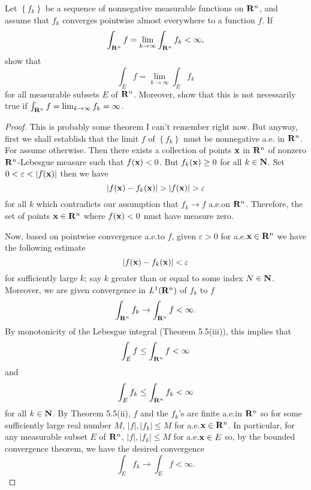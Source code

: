 \begin{problem}
Let $\left\{f_k\right\}$ be a sequence of nonnegative measurable functions
on $\mathbf{R}^n$, and assume that $f_k$ converges pointwise almost everywhere to
a function $f$. If
\[
\int_{\mathbf{R}^n} f=\lim_{k\to\infty}\int_{\mathbf{R}^n} f_k<\infty,
\]
show that
\[
\int_E f=\lim_{k\to\infty}\int_E f_k
\]
for all measurable subsets $E$ of $\mathbf{R}^n$. Moreover, show that this is not
necessarily true if $\int_{\mathbf{R}^n} f=\lim_{k\to\infty} f_k=\infty$.
\end{problem}
\begin{proof}
This is probably some theorem I can't remember right now. But anyway, first
we shall establish that the limit $f$ of $\left\{f_k\right\}$ must be
nonnegative a.e. in $\mathbf{R}^n$. For assume otherwise. Then there exists a
collection of points $\mathbf{x}$ in $\mathbf{R}^n$ of nonzero $\mathbf{R}^n$-Lebesgue
measure such that $f(\mathbf{x})<0$. But $f_k(\mathbf{x})\geq 0$ for all
$k\in\mathbf{N}$. Set $0<\varepsilon<|f(\bfx)|$ then we have
\begin{equation}
\label{eq:estimate-contradiction-1}
|f(\bfx)-f_k(\bfx)|>|f(\bfx)|>\varepsilon
\end{equation}
for all $k$ which contradicts our assumption that $f_k\to f$ a.e.\@ on
$\mathbf{R}^n$. Therefore, the set of points $\mathbf{x}\in\mathbf{R}^n$ where $f(\mathbf{x})<0$
must have measure zero.

Now, based on pointwise convergence a.e.\@ to $f$, given $\varepsilon>0$
for a.e.\@ $\mathbf{x}\in\mathbf{R}^n$ we have the following estimate
\begin{equation}
\label{eq:estimate-2}
|f(\mathbf{x})-f_k(\mathbf{x})|<\varepsilon
\end{equation}
for sufficiently large $k$; say $k$ greater than or equal to some index
$N\in\mathbf{N}$. Moreover, we are given convergence in $L^1(\mathbf{R}^n)$ of $f_k$ to
$f$
\begin{equation}
\label{eq:integral-estimate-1}
\int_{\mathbf{R}^n}f_k\to\int_{\mathbf{R}^n}f<\infty.
\end{equation}
By monotonicity of the Lebesgue integral (Theorem 5.5(iii)), this implies
that
\begin{equation}
\label{eq:estimate-monotonicity-2}
\int_E f\leq\int_{\mathbf{R}^n} f<\infty
\end{equation}
and
\begin{equation}
\label{eq:estimate-monotonicity-k-2}
\int_E f_k\leq\int_{\mathbf{R}^n}f_k<\infty
\end{equation}
for all $k\in\mathbf{N}$. By Theorem 5.5(ii), $f$ and the $f_k$'s are finite
a.e.\@ in $\mathbf{R}^n$ so for some sufficiently large real number $M$,
$|f|,|f_k|\leq M$ for a.e.\@ $\mathbf{x}\in\mathbf{R}^n$. In particular, for any
measurable subset $E$ of $\mathbf{R}^n$, $|f|,|f_k|\leq M$ for a.e.\@ $\mathbf{x}\in E$
so, by the bounded convergence theorem, we have the desired convergence
\begin{equation}
\label{eq:desired-convergence-2}
\int_E f_k\to\int_E f<\infty.
\end{equation}


\end{proof}
